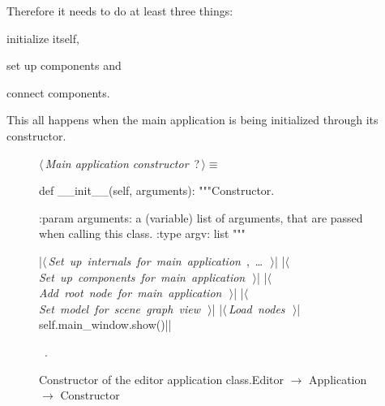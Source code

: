 \documentclass[%
    a4paper,    %
    justified,  %
    nobib,      %
    openany     %
]{tufte-book}
\makeatletter
\renewcommand{\label}[1]{\@tufte@label{##1}}%
\makeatother
\begin{document}
Therefore it needs to do at least three things:
\begin{enumerate*}
  \item initialize itself,
  \item set up components and
  \item connect components.
  \end{enumerate*}
This all happens when the main application is being initialized through its
constructor.

\begin{figure}[h]
\begin{flushleft} \small
\begin{minipage}{\linewidth}\label{scrap13}\raggedright\small
{} $\langle\,${\itshape Main application constructor}\nobreak\ {\footnotesize {?}}$\,\rangle\equiv$
\vspace{-1ex}
\begin{pythoncode}
def __init__(self, arguments):
    """Constructor.

    :param arguments: a (variable) list of arguments, that are
                      passed when calling this class.
    :type  argv:      list
    """

    |\hbox{$\langle\,${\itshape Set up internals for main application}\nobreak\ {\footnotesize {}, \ldots\ }$\,\rangle$}|
    |\hbox{$\langle\,${\itshape Set up components for main application}\nobreak\ {\footnotesize {}}$\,\rangle$}|
    |\hbox{$\langle\,${\itshape Add root node for main application}\nobreak\ {\footnotesize {}}$\,\rangle$}|
    |\hbox{$\langle\,${\itshape Set model for scene graph view}\nobreak\ {\footnotesize {}}$\,\rangle$}|
    |\hbox{$\langle\,${\itshape Load nodes}\nobreak\ {\footnotesize {}}$\,\rangle$}|
    self.main_window.show()|\NWsep|
\end{pythoncode}
\vspace{1.5ex}
\footnotesize
\begin{list}{}{\setlength{\itemsep}{-\parsep}\setlength{\itemindent}{-\leftmargin}}
\item \NWtxtMacroRefIn\ .

\item{}
\end{list}
\end{minipage}\vspace{4ex}
\end{flushleft}
\caption{Constructor of the editor application
    class.\newline{}\newline{}Editor $\rightarrow$ Application $\rightarrow$
    Constructor} \label{editor:lst:app:constructor}
\end{figure}
\end{document}
